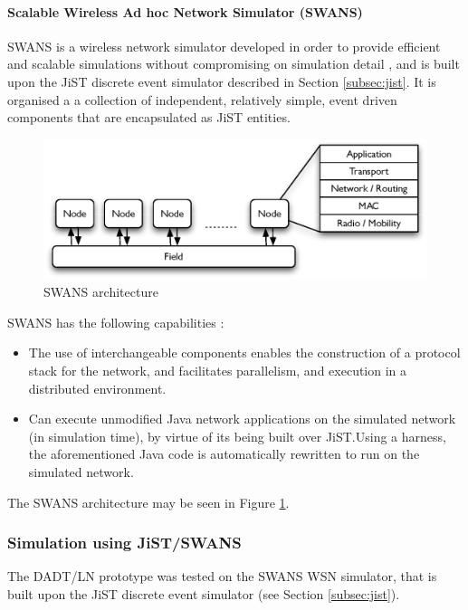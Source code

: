 \paragraph{Scalable Wireless Ad hoc Network Simulator (SWANS)}
SWANS is a wireless network simulator developed in order to provide efficient
and scalable simulations without compromising on simulation detail \cite{barr_SWANS},
and is built upon the JiST discrete event simulator described in Section \ref{subsec:jist}. 
It is organised a a collection of independent, relatively simple, event driven
components that are encapsulated as JiST entities. 

\begin{figure}[h]
\centering
\includegraphics[width=\textwidth]{img/SWANS_architecture.eps} 
\caption[SWANS architecture]{SWANS architecture}
\label{Fig:SWANS_architecture}
\end{figure} 
  
SWANS has the following capabilities \cite{barr_SWANS}:

\begin{itemize}
\item The use of
interchangeable components enables the construction of a protocol stack for the
network, and facilitates parallelism, and execution in a distributed environment.
\item Can execute unmodified Java network applications on the
simulated network (in simulation time), by virtue of its being built over
JiST.Using a harness, the aforementioned Java code is automatically rewritten to
run on the simulated network.  
\end{itemize}
   
The SWANS architecture may be seen in Figure \ref{Fig:SWANS_architecture}. 


\subsubsection{Simulation using JiST/SWANS}

The DADT/LN prototype was tested on the SWANS WSN simulator, that is built upon
the JiST discrete event simulator (see Section \ref{subsec:jist}). 

